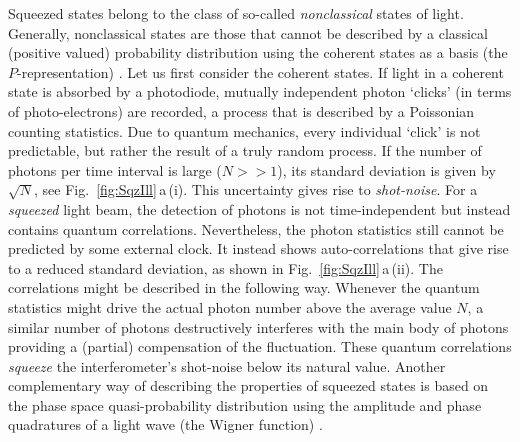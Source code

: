 Squeezed states \cite{Yuen1976,Walls1983,Breitenbach1997,Dodonov2002} belong to the class of so-called \textit{nonclassical} states of light.
Generally, nonclassical states are those that cannot be described by a classical (positive valued) probability distribution using the coherent states as a basis (the $P$-representation) \cite{GerryKnight}. Let us first consider the coherent states. If light in a coherent state is absorbed by a photodiode, mutually independent photon `clicks' (in terms of photo-electrons) are recorded, a process that is described by a Poissonian counting statistics. Due to quantum mechanics, every individual `click' is not predictable, but rather the result of a truly random process. If the number of photons per time interval is large ($N\!>\!\!>\!1$), its standard deviation is given by $\sqrt{N}$, see Fig.~\ref{fig:SqzIll}\,a\,(i). This uncertainty gives rise to \textit{shot-noise}. For a \emph{squeezed} light beam, the detection of photons is not time-independent but instead contains quantum correlations.  Nevertheless, the photon statistics still cannot be predicted by some external clock. It instead shows auto-correlations that give rise to a reduced standard deviation, as shown in Fig.~\ref{fig:SqzIll}\,a\,(ii). The correlations might be described in the following way. Whenever the quantum statistics might drive the actual photon number above the average value $N$, a similar number of photons destructively interferes with the main body of photons providing a (partial) compensation of the fluctuation. These quantum correlations \textit{squeeze} the interferometer's shot-noise below its natural value. Another complementary way of describing the properties of squeezed states is based on the phase space quasi-probability distribution using the amplitude and phase quadratures of a light wave (the Wigner function) \cite{Walls1983,GerryKnight}.

